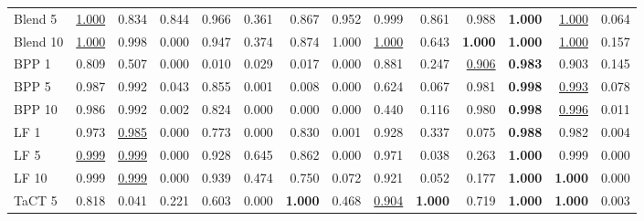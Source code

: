 \begin{table}[htbp]
\begin{adjustbox}{max width=\textwidth}
\begin{tabular}{lrrrrrrrrrrrrr}
Blend 5 & \underline{1.000} & 0.834 & 0.844 & 0.966 & \textcolor{black!45}{0.361} & 0.867 & 0.952 & 0.999 & 0.861 & 0.988 & \textbf{1.000} & \underline{1.000} & \textcolor{black!45}{0.064} \\
Blend 10 & \underline{1.000} & 0.998 & \textcolor{black!45}{0.000} & 0.947 & \textcolor{black!45}{0.374} & 0.874 & 1.000 & \underline{1.000} & 0.643 & \textbf{1.000} & \textbf{1.000} & \underline{1.000} & \textcolor{black!45}{0.157} \\
BPP 1 & 0.809 & 0.507 & \textcolor{black!45}{0.000} & \textcolor{black!45}{0.010} & \textcolor{black!45}{0.029} & \textcolor{black!45}{0.017} & \textcolor{black!45}{0.000} & 0.881 & \textcolor{black!45}{0.247} & \underline{0.906} & \textbf{0.983} & 0.903 & \textcolor{black!45}{0.145} \\
BPP 5 & 0.987 & 0.992 & \textcolor{black!45}{0.043} & 0.855 & \textcolor{black!45}{0.001} & \textcolor{black!45}{0.008} & \textcolor{black!45}{0.000} & 0.624 & \textcolor{black!45}{0.067} & 0.981 & \textbf{0.998} & \underline{0.993} & \textcolor{black!45}{0.078} \\
BPP 10 & 0.986 & 0.992 & \textcolor{black!45}{0.002} & 0.824 & \textcolor{black!45}{0.000} & \textcolor{black!45}{0.000} & \textcolor{black!45}{0.000} & \textcolor{black!45}{0.440} & \textcolor{black!45}{0.116} & 0.980 & \textbf{0.998} & \underline{0.996} & \textcolor{black!45}{0.011} \\
LF 1 & 0.973 & \underline{0.985} & \textcolor{black!45}{0.000} & 0.773 & \textcolor{black!45}{0.000} & 0.830 & \textcolor{black!45}{0.001} & 0.928 & \textcolor{black!45}{0.337} & \textcolor{black!45}{0.075} & \textbf{0.988} & 0.982 & \textcolor{black!45}{0.004} \\
LF 5 & \underline{0.999} & \underline{0.999} & \textcolor{black!45}{0.000} & 0.928 & 0.645 & 0.862 & \textcolor{black!45}{0.000} & 0.971 & \textcolor{black!45}{0.038} & \textcolor{black!45}{0.263} & \textbf{1.000} & 0.999 & \textcolor{black!45}{0.000} \\
LF 10 & 0.999 & \underline{0.999} & \textcolor{black!45}{0.000} & 0.939 & \textcolor{black!45}{0.474} & 0.750 & \textcolor{black!45}{0.072} & 0.921 & \textcolor{black!45}{0.052} & \textcolor{black!45}{0.177} & \textbf{1.000} & \textbf{1.000} & \textcolor{black!45}{0.000} \\
TaCT 5 & 0.818 & \textcolor{black!45}{0.041} & \textcolor{black!45}{0.221} & 0.603 & \textcolor{black!45}{0.000} & \textbf{1.000} & \textcolor{black!45}{0.468} & \underline{0.904} & \textbf{1.000} & 0.719 & \textbf{1.000} & \textbf{1.000} & \textcolor{black!45}{0.003} \\

\end{tabular}
\end{adjustbox}
\end{table}
